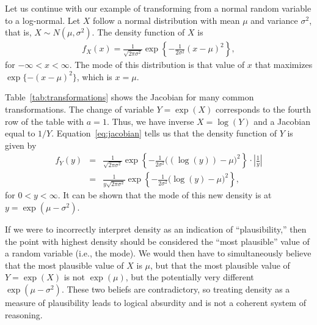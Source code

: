 \documentclass[9pt,twocolumn,twoside]{cidlab-draft}\templatetype{cidlab-invited}
\newcommand{\ora}[1]{{#1}}
\newcommand{\blu}[1]{{#1}}
\begin{document}
Let us continue with our example of transforming from a normal random variable to a log-normal. Let $X$ follow a normal distribution with mean $\mu$ and variance $\sigma^2$, that is, $X\sim N(\mu,\sigma^2)$. The density function of $X$ is 
\begin{eqnarray*}
f_X(x) = \frac{1}{\sqrt{2\pi\sigma^2}}\exp\left\{-\frac{1}{2\sigma^2}(x-\mu)^2\right\},
\end{eqnarray*}
for $-\infty < x < \infty$. The mode of this distribution is that value of $x$ that maximizes $\exp\{-(x-\mu)^2\}$, which is $x=\mu$.  

Table~\ref{tab:transformations} shows the Jacobian for many common transformations. The change of variable $Y=\exp(X)$ corresponds to the fourth row of the table with $a=1$. Thus, we have inverse $X=\log(Y)$ and a Jacobian equal to $1/Y$. Equation~\ref{eq:jacobian} tells us that the density function of $Y$ is given by
\begin{eqnarray*}
f_Y(y) &=&  \frac{1}{\sqrt{2\pi\sigma^2}}\exp\left\{-\frac{1}{2\sigma^2}\Big(\left(\ora{\log(y)}\right)-\mu\Big)^2\right\}\cdot\left|\blu{\frac{1}{y}}\right|\\
&=& \frac{1}{\blu{y}\sqrt{2\pi\sigma^2}}\exp\left\{-\frac{1}{2\sigma^2}\Big(\ora{\log(y)}-\mu\Big)^2\right\},
\end{eqnarray*}
for $0<y<\infty$. It can be shown that the mode of this new density is at $y=\exp{(\mu-\sigma^2)}$. 

If we were to incorrectly interpret density as an indication of ``plausibility,'' then the point with highest density should be considered the ``most plausible'' value of a random variable (i.e., the mode). We would then have to simultaneously believe that the most plausible value of $X$ is $\mu$, but that the most plausible value of $Y=\exp{(X)}$ is not $\exp{(\mu)}$, but the potentially very different $\exp{(\mu-\sigma^2)}$. These two beliefs are contradictory, so treating density as a measure of plausibility leads to logical absurdity and is not a coherent system of reasoning. 
\end{document}
